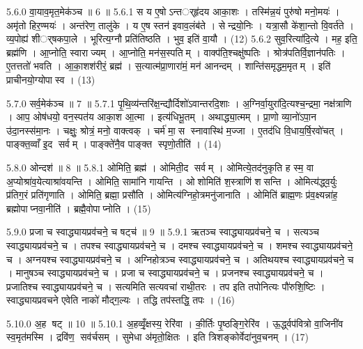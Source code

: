 5.6.0
वा॒याव॒मृत॒मेक॑ञ्च ॥ 6 ॥
5.6.1
स य ए॒षोऽन्तर््हृ॑दय आका॒शः । तस्मि॑न्न॒यं पुरु॑षो मनो॒मयः॑ । अमृ॑तो हिर॒ण्मयः॑ । अन्त॑रेण॒ तालु॑के । य ए॒ष स्तन॑ इवाव॒लंब॑ते । सेन्द्रयो॒निः । यत्रा॒सौ के॑शा॒न्तो वि॒वर्त॑ते । व्य॒पोह्य॑ शीर््षकपा॒ले । भूरित्य॒ग्नौ प्रति॑तिष्ठति । भुव॒ इति॑ वा॒यौ । (12)
5.6.2
सुव॒रित्या॑दि॒त्ये । मह॒ इति॒ ब्रह्म॑णि । आ॒प्नोति॒ स्वाराज्यम् । आ॒प्नोति॒ मन॑स॒स्पतिम् । वाक्प॑ति॒श्चक्षु॑ष्पतिः । श्रोत्र॑पतिर्वि॒ज्ञान॑पतिः । ए॒तत्ततो॑ भवति । आ॒का॒शश॑रीरं॒ ब्रह्म॑ । स॒त्यात्म॑प्रा॒णारा॑मं॒ मन॑ आनन्दम् । शान्ति॑समृद्धम॒मृतम् । इति॑ प्राचीनयो॒ग्योपास्व । (13)
\anuvakamend

5.7.0
सर्व॒मेक॑ञ्च ॥ 7 ॥
5.7.1
पृ॒थि॒व्य॑न्तरि॑क्ष॒न्द्यौर्दिशो॑ऽवान्तरदि॒शाः । अ॒ग्निर्वा॒युरा॑दि॒त्यश्च॒न्द्रमा॒ नक्ष॑त्राणि । आप॒ ओष॑धयो॒ वन॒स्पत॑य आका॒श आ॒त्मा । इत्य॑धिभू॒तम् । अथाद्ध्या॒त्मम् । प्रा॒णो व्या॒नो॑ऽपा॒न उ॑दा॒नस्स॑मा॒नः । चक्षुः॒ श्रोत्रं॒ मनो॒ वाक्त्वक् । चर्म॑ मा॒स स्नावास्थि॑ म॒ज्जा । ए॒तद॑धि वि॒धाय॒र्\mbox{}षि॒रवो॑चत् । पाङ्क्त॒व्वाँ इ॒द सर्वम् । पाङ्क्ते॑नै॒व पाङ्क्त स्पृणो॒तीति॑ । (14)
\anuvakamend

5.8.0
ओन्दश॑ ॥ 8 ॥
5.8.1
ओमिति॒ ब्रह्म॑ । ओमिती॒द सर्वम् । ओमित्ये॒तद॑नुकृति ह स्म॒ वा अ॒प्योश्रा॑व॒येत्याश्रा॑वयन्ति । ओमिति॒ सामा॑नि गायन्ति । ओशोमिति॑ श॒स्त्राणि॑ शसन्ति । ओमित्य॑द्ध्व॒र्युः प्र॑तिग॒रं प्रति॑गृणाति । ओमिति॒ ब्रह्मा॒ प्रसौ॑ति । ओमित्य॑ग्निहो॒त्रमनु॑जानाति । ओमिति॑ ब्राह्म॒णः प्र॑व॒क्ष्यन्ना॑ह॒ ब्रह्मोपाप्नवा॒नीति॑ । ब्रह्मै॒वोपाप्नोति । (15)
\anuvakamend

5.9.0
प्रजा च स्वाद्ध्यायप्रव॑चने॒ च षट्च॑ ॥ 9 ॥
5.9.1
ऋतञ्च स्वाद्ध्यायप्रव॑चने॒ च । सत्यञ्च स्वाद्ध्यायप्रव॑चने॒ च । तपश्च स्वाद्ध्यायप्रव॑चने॒ च । दमश्च स्वाद्ध्यायप्रव॑चने॒ च । शमश्च स्वाद्ध्यायप्रव॑चने॒ च । अग्नयश्च स्वाद्ध्यायप्रव॑चने॒ च । अग्निहोत्रञ्च स्वाद्ध्यायप्रव॑चने॒ च । अतिथयश्च स्वाद्ध्यायप्रव॑चने॒ च । मानुषञ्च स्वाद्ध्यायप्रव॑चने॒ च । प्रजा च स्वाद्ध्यायप्रव॑चने॒ च । प्रजनश्च स्वाद्ध्यायप्रव॑चने॒ च । प्रजातिश्च स्वाद्ध्यायप्रव॑चने॒ च । सत्यमिति सत्यवचा॑ राथी॒तरः । तप इति तपोनित्यः पौ॑रुशि॒ष्टिः । स्वाद्ध्यायप्रवचने एवेति नाको॑ मौद्ग॒ल्यः । तद्धि तप॑स्तद्धि॒ तपः । (16)
\anuvakamend

5.10.0
अ॒ह षट् ॥ 10 ॥
5.10.1
अ॒हव्वृँ॒क्षस्य॒ रेरि॑वा । की॒र्तिः पृ॒ष्ठङ्गि॒रेरि॑व । ऊ॒र्द्ध्वप॑वित्रो वा॒जिनी॑व स्व॒मृत॑मस्मि । द्रवि॑ण॒ सव॑र्चसम् । सुमेधा अ॑मृतो॒क्षितः । इति त्रिशङ्कोर्वेदा॑नुव॒चनम् । (17)
\anuvakamend

